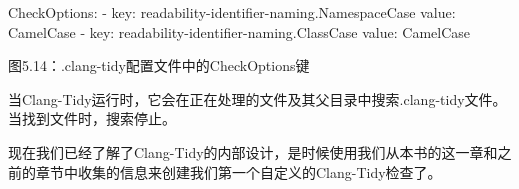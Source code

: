 \begin{shell}
CheckOptions:
- key: readability-identifier-naming.NamespaceCase
  value: CamelCase
- key: readability-identifier-naming.ClassCase
  value: CamelCase
\end{shell}

\begin{center}
图5.14：.clang-tidy配置文件中的CheckOptions键
\end{center}

当Clang-Tidy运行时，它会在正在处理的文件及其父目录中搜索.clang-tidy文件。当找到文件时，搜索停止。

现在我们已经了解了Clang-Tidy的内部设计，是时候使用我们从本书的这一章和之前的章节中收集的信息来创建我们第一个自定义的Clang-Tidy检查了。





























